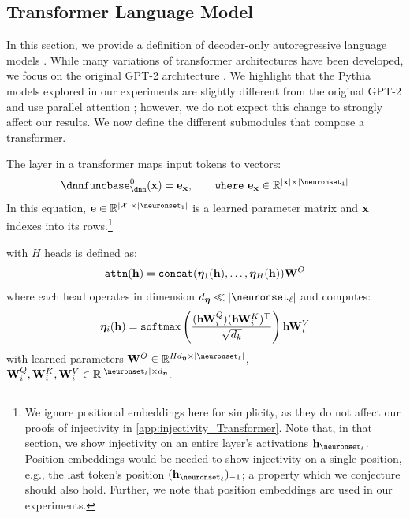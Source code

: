 \subsection{Transformer Language Model}\label{appsubsec:Language_Model_Transformer}

In this section, we provide a definition of decoder-only autoregressive language models \citep{radford2019language, vaswani2017attention}. 
While many variations of transformer architectures have been developed, we focus on the original GPT-2 architecture \citep{radford2019language}.
We highlight that the Pythia models explored in our experiments are slightly different from the original GPT-2 and use parallel attention \citep{chowdhery2023palm}; however, we do not expect this change to strongly affect our results.
We now define the different submodules that compose a transformer.  

\begin{submodule}\label{definition:Embedding}
    The  layer in a transformer maps input tokens to vectors:
    \begin{align}
        \dnnfunclayer{0}(\bx) = \embeddings_{\bx}, \qquad\mathtt{where}\,\,\embeddings_{\bx}\in \R^{|\bx| \times \layerdim{1}}
    \end{align}
    In this equation, $\embeddings \in \R^{|\calX| \times \layerdim{1}}$ is a learned parameter matrix and $\mathbf{x}$ indexes into its rows.\footnote{We ignore positional embeddings here for simplicity, as they do not affect our proofs of injectivity in \cref{app:injectivity_Transformer}. Note that, in that section, we show injectivity on an entire layer's activations $\hiddenstates_{\neuronset_{\layer}}$. 
    Position embeddings would be needed to show injectivity on a single position, e.g., the last token's position $(\hiddenstates_{\neuronset_{\layer}})_{-1}$; a property which we conjecture should also hold.
    Further, we note that position embeddings are used in our experiments.}
\end{submodule}

\begin{submodule}\label{definition:Multi_Head_Self_Attention}
     with $H$ heads is defined as:
    \begin{align}
        \mathtt{attn}(\mathbf{h}) = \mathtt{concat}(\boldsymbol \eta_1(\mathbf{h}), \ldots, \boldsymbol \eta_H(\mathbf{h}))\mathbf{W}^O\label{eq:transformer_concat_attention}
    \end{align}
    where each head operates in dimension $d_{\head} \ll \layerdim{\layer}$ and computes:
    \begin{align}
        \boldsymbol \eta_i(\mathbf{h}) = \mathtt{softmax}\left(\frac{(\mathbf{h}\mathbf{W}_i^Q)(\mathbf{h}\mathbf{W}_i^K)^\top}{\sqrt{d_k}}\right)\mathbf{h}\mathbf{W}_i^V
    \end{align}
    with learned parameters $\mlpweights^O\in \R^{H d_{\head} \times\layerdim{\layer}}$, $\mlpweights_i^Q,\mlpweights_i^K,\mlpweights_i^V\in \R^{\layerdim{\layer}\times d_{\head}}$.
\end{submodule}

